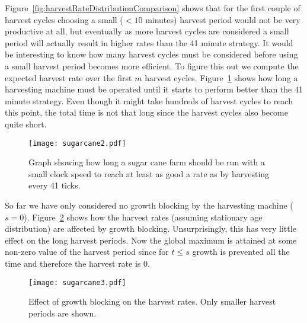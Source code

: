 	Figure~\ref{fig:harvestRateDistributionComparison} shows that for the first couple of
	harvest cycles choosing a small ($<10$ minutes) harvest period would not be very
	productive at all, but eventually as more harvest cycles are considered a small period
	will actually result in higher rates than the 41 minute strategy. It would be
	interesting to know how many harvest cycles must be considered before using a small
	harvest period becomes more efficient. To figure this out we compute the expected
	harvest rate over the first $m$ harvest cycles. Figure~\ref{fig:sugarcane2} shows how
	long a harvesting machine must be operated until it starts to perform better than the
	41 minute strategy. Even though it might take hundreds of harvest cycles to reach this
	point, the total time is not that long since the harvest cycles also become quite
	short.
	\begin{figure}[h!]
		\centering
		\texttt{[image: sugarcane2.pdf]}
		\caption{Graph showing how long a sugar cane farm should be run with a small clock
		speed to reach at least as good a rate as by harvesting every 41 ticks.}
		\label{fig:sugarcane2}
	\end{figure}

	So far we have only considered no growth blocking by the harvesting machine ($s=0$).
	Figure~\ref{fig:sugarcane3} shows how the harvest rates (assuming stationary age
	distribution) are affected by growth blocking. Unsurprisingly, this has very little
	effect on the long harvest periods. Now the global maximum is attained at some
	non-zero value of the harvest period since for $t\leq s$ growth is prevented all the
	time and therefore the harvest rate is 0.
	\begin{figure}[h!]
		\centering
		\texttt{[image: sugarcane3.pdf]}
		\caption{Effect of growth blocking on the harvest rates. Only smaller harvest
		periods are shown.}
		\label{fig:sugarcane3}
	\end{figure}

